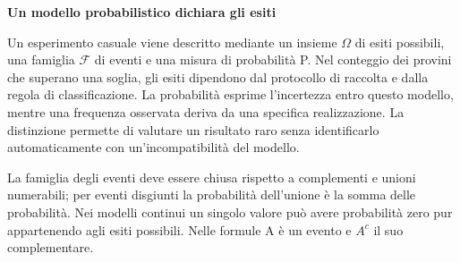 \documentclass[12pt,aspectratio=1610]{beamer}
\begin{document}
\begin{frame}[plain]
\end{frame}
\begin{lrbox}{\TitleBox}\begin{minipage}[t]{18.2cm}\raggedright\sloppy\color{Ink}\fontsize{20.7}{24}\selectfont \bfseries\color{Navy}Un modello probabilistico dichiara gli esiti\end{minipage}\end{lrbox}
\begin{lrbox}{\BodyBox}\begin{minipage}[t]{10.25cm}\raggedright\sloppy\color{Ink}\fontsize{12.4}{16.4}\selectfont Un esperimento casuale viene descritto mediante un insieme $\Omega$ di esiti possibili, una famiglia $\mathcal F$ di eventi e una misura di probabilità P. Nel conteggio dei provini che superano una soglia, gli esiti dipendono dal protocollo di raccolta e dalla regola di classificazione. La probabilità esprime l’incertezza entro questo modello, mentre una frequenza osservata deriva da una specifica realizzazione. La distinzione permette di valutare un risultato raro senza identificarlo automaticamente con un’incompatibilità del modello.\par{}\end{minipage}\end{lrbox}
\begin{lrbox}{\SideBox}\begin{minipage}[t]{7.45cm}\raggedright\sloppy\color{Ink}\fontsize{12.2}{16.1}\selectfont La famiglia degli eventi deve essere chiusa rispetto a complementi e unioni numerabili; per eventi disgiunti la probabilità dell’unione è la somma delle probabilità. Nei modelli continui un singolo valore può avere probabilità zero pur appartenendo agli esiti possibili. Nelle formule A è un evento e $A^c$ il suo complementare.\end{minipage}\end{lrbox}
\end{document}
